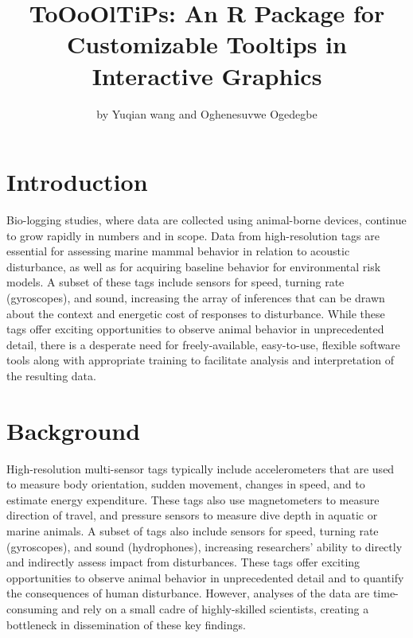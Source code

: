 \title{ToOoOlTiPs: An R Package for Customizable Tooltips in Interactive Graphics}


\author{by Yuqian wang and Oghenesuvwe Ogedegbe}

\maketitle


\hypertarget{introduction}{%
\section{Introduction}\label{introduction}}

Bio-logging studies, where data are collected using animal-borne devices, continue to grow rapidly in numbers and in scope. Data from high-resolution tags are essential for assessing marine mammal behavior in relation to acoustic disturbance, as well as for acquiring baseline behavior for environmental risk models. A subset of these tags include sensors for speed, turning rate (gyroscopes), and sound, increasing the array of inferences that can be drawn about the context and energetic cost of responses to disturbance. While these tags offer exciting opportunities to observe animal behavior in unprecedented detail, there is a desperate need for freely-available, easy-to-use, flexible software tools along with appropriate training to facilitate analysis and interpretation of the resulting data.

\hypertarget{background}{%
\section{Background}\label{background}}

High-resolution multi-sensor tags typically include accelerometers that are used to measure body orientation, sudden movement, changes in speed, and to estimate energy expenditure. These tags also use magnetometers to measure direction of travel, and pressure sensors to measure dive depth in aquatic or marine animals. A subset of tags also include sensors for speed, turning rate (gyroscopes), and sound (hydrophones), increasing researchers' ability to directly and indirectly assess impact from disturbances. These tags offer exciting opportunities to observe animal behavior in unprecedented detail and to quantify the consequences of human disturbance. However, analyses of the data are time-consuming and rely on a small cadre of highly-skilled scientists, creating a bottleneck in dissemination of these key findings.

